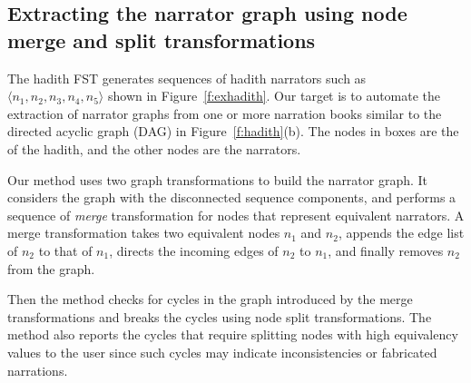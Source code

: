 \documentclass{llncs}
\begin{document}
%
%
%
\subsection{Extracting the narrator graph using node merge and split transformations}
\label{sec:graph}


The hadith FST generates sequences of hadith narrators
such as $\langle n_1,n_2,n_3,n_4,n_5 \rangle$ shown in 
Figure~\ref{f:exhadith}. 
Our target is to automate the extraction of 
narrator graphs from one or more narration books
similar to the directed acyclic graph (DAG) 
in Figure~\ref{f:hadith}(b).
The nodes in boxes are the  of the hadith, 
and the other nodes are the narrators.

Our method uses two graph transformations to build the narrator
graph. 
It considers the graph with the disconnected sequence components, 
and performs a sequence of {\em merge} transformation 
for nodes that
represent equivalent narrators. 
A merge transformation takes two equivalent nodes $n_1$ and $n_2$,
appends the edge list of $n_2$ to that of $n_1$,
directs the incoming edges of $n_2$ to $n_1$,
and finally removes $n_2$ from the graph.
   
Then the method checks for cycles in the graph
introduced by the merge transformations and breaks the cycles
using node split transformations. 
The method also reports the cycles that require splitting nodes 
with high equivalency values to the user since such cycles may
indicate inconsistencies or fabricated narrations.
\end{document}
